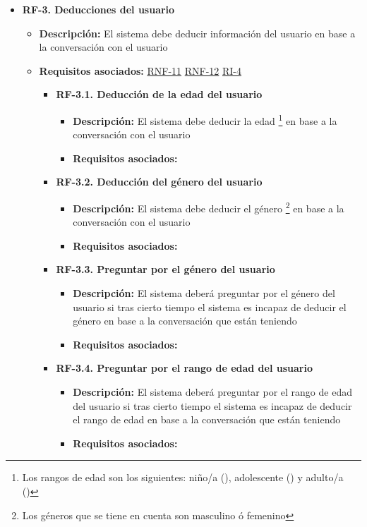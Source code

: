 \begin{itemize}
    \item \textbf{RF-3. Deducciones del usuario} \label{RF-3}
    \begin{itemize}
        \item \textbf{Descripción:} El sistema debe deducir información del usuario en base a la conversación con el usuario
        \item \textbf{Requisitos asociados:} \hyperref[RNF-11]{RNF-11} \hyperref[RNF-12]{RNF-12} \hyperref[RI-4]{RI-4}
        \begin{itemize}
            \item \textbf{RF-3.1. Deducción de la edad del usuario} \label{RF-3.1}
            \begin{itemize}
                \item \textbf{Descripción:} El sistema debe deducir la edad \footnote{Los rangos de edad son los siguientes: niño/a (), adolescente () y adulto/a ()} en base a la conversación con el usuario
                \item \textbf{Requisitos asociados:} 
            \end{itemize}
            
            \item \textbf{RF-3.2. Deducción del género del usuario} \label{RF-3.2}
            \begin{itemize}
                \item \textbf{Descripción:} El sistema debe deducir el género \footnote{Los géneros que se tiene en cuenta son masculino ó femenino} en base a la conversación con el usuario
                \item \textbf{Requisitos asociados:} 
            \end{itemize}
            
            \item \textbf{RF-3.3. Preguntar por el género del usuario} \label{RF-3.3}
            \begin{itemize}
                \item \textbf{Descripción:} El sistema deberá preguntar por el género del usuario si tras cierto tiempo el sistema es incapaz de deducir el género en base a la conversación que están teniendo
                \item \textbf{Requisitos asociados:} 
            \end{itemize}
            
            \item \textbf{RF-3.4. Preguntar por el rango de edad del usuario} \label{RF-3.4}
            \begin{itemize}
                \item \textbf{Descripción:} El sistema deberá preguntar por el rango de edad del usuario si tras cierto tiempo el sistema es incapaz de deducir el rango de edad en base a la conversación que están teniendo
                \item \textbf{Requisitos asociados:} 
            \end{itemize}
        \end{itemize}
    \end{itemize}
\end{itemize}

